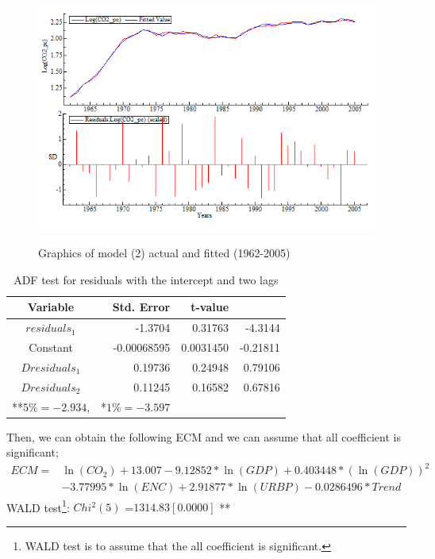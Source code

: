 \documentclass[12pt, a4paper]{article}
\begin{document}
\begin{figure}[h]
  \begin{center}
    \caption{Graphics of model (2) actual and fitted (1962-2005)}
    \includegraphics[scale=0.8]{fig1.png}
    \label{fig1} 
  \end{center}
\end{figure}

\begin{table}[h]
  \caption{ADF test for residuals with the intercept and two lags}
  \label{adf3}
  \centering
  \begin{tabular}{crrr}
    \hline
   Variable  & Std. Error & t-value\\
\hline\hline
$residuals_1$     &   -1.3704  &    0.31763  &    -4.3144\\
Constant    &   -0.00068595  &  0.0031450  &   -0.21811\\
$Dresiduals_1$ &    0.19736   &   0.24948  &    0.79106\\
$Dresiduals_2$  &     0.11245  &    0.16582  &    0.67816\\
    \hline
**$5\%=-2.934$, & *$1\%=-3.597$
  \end{tabular}
\end{table}

\newpage

Then, we can obtain the following ECM and we can assume that all coefficient is significant;\\
\[
\begin{split}
ECM =& \ln{(CO_2)} + 13.007 - 9.12852*\ln{(GDP)} + 0.403448*(\ln{(GDP)})^2 \\
&- 3.77995*\ln{(ENC)}+ 2.91877*\ln{(URBP)} - 0.0286496*Trend
\end{split}
\]
WALD test\footnote{WALD test is to assume that the all coefficient is significant.}: $Chi^2(5)$ =$ 1314.83 [0.0000]$ **
\end{document}
